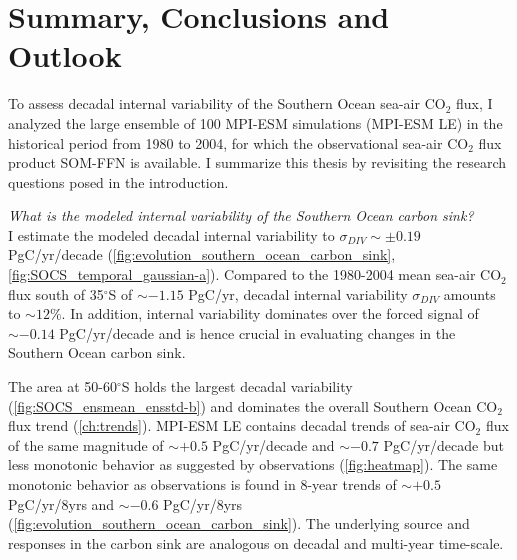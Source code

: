 \chapter{Summary, Conclusions and Outlook} \label{ch:conclusions}%

To assess decadal internal variability of the Southern Ocean sea-air CO$_2$ flux, I analyzed the large ensemble of 100 \acl{MPI-ESM} simulations (\acs{MPI-ESM LE}) in the historical period from 1980 to 2004, for which the observational sea-air CO$_2$ flux product \acf{SOM-FFN} is available. I summarize this thesis by revisiting the research questions posed in the introduction.\newline %

\textit{What is the modeled internal variability of the Southern Ocean carbon sink?}\\

I estimate the modeled decadal internal variability to $\sigma_{DIV}\sim\pm0.19$ PgC/yr/decade (\autoref{fig:evolution_southern_ocean_carbon_sink}, \ref{fig:SOCS_temporal_gaussian-a}). Compared to the 1980-2004 mean sea-air CO$_2$ flux south of 35$^\circ$S of $\sim-1.15$ PgC/yr, decadal internal variability $\sigma_{DIV}$ amounts to $\sim12\%$. In addition, internal variability dominates over the forced signal of $\sim-0.14$ PgC/yr/decade and is hence crucial in evaluating changes in the Southern Ocean carbon sink. %

The area at 50-60$^\circ$S holds the largest decadal variability (\autoref{fig:SOCS_ensmean_ensstd-b}) and dominates the overall Southern Ocean CO$_2$ flux trend (\autoref{ch:trends}). \acs{MPI-ESM LE} contains decadal trends of sea-air CO$_2$ flux of the same magnitude of $\sim+0.5$ PgC/yr/decade and $\sim-0.7$ PgC/yr/decade but less monotonic behavior as suggested by observations \citep{landschuetzer2015} (\autoref{fig:heatmap}).  
The same monotonic behavior as observations is found in 8-year trends of $\sim+0.5$ PgC/yr/8yrs and $\sim-0.6$ PgC/yr/8yrs (\autoref{fig:evolution_southern_ocean_carbon_sink}). The underlying source and responses in the carbon sink are analogous on decadal and multi-year time-scale. \newline

